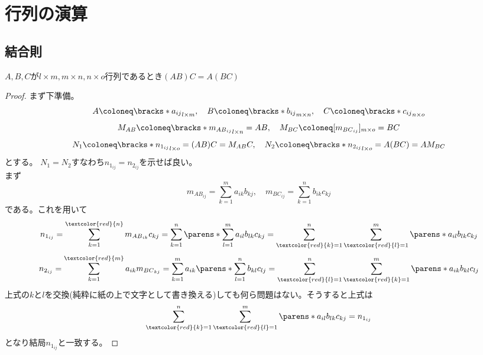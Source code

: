 \chapter{行列の演算}
    \section{結合則}
        \begin{shadebox}
            $A,B,C$が$l \times m, m \times n, n \times o$行列であるとき$(AB)C = A(BC)$
        \end{shadebox}
        \begin{proof}
            まず下準備。
            \[A \coloneq \bracks*{a_{ij}}_{l\times m},\quad B \coloneq \bracks*{b_{ij}}_{m\times n},\quad C \coloneq \bracks*{c_{ij}}_{n\times o}\]
            \[M_{AB} \coloneq \bracks*{m_{{AB}_{ij}}}_{l\times n} = AB,\quad M_{BC} \coloneq [m_{{BC}_{ij}}]_{m\times o} = BC\]
            \[N_1 \coloneq \bracks*{n_{1_{ij}}}_{l\times o} = (AB)C = M_{AB}C,\quad N_2 \coloneq \bracks*{n_{2_{ij}}}_{l\times o} = A(BC) = AM_{BC}\]
            とする。
            $N_1 = N_2$すなわち$n_{1_{ij}} = n_{2_{ij}}$を示せば良い。\\
            まず
            \[m_{{AB}_{ij}} = \sum_{k=1}^{m}{a_{ik}b_{kj}},\quad m_{{BC}_{ij}} = \sum_{k=1}^{n}{b_{ik}c_{kj}}\]
            である。これを用いて
            \[n_{1_{ij}} = \sum_{k=1}^{\textcolor{red}{n}}{m_{{AB}_{ik}}c_{kj}} = \sum_{k=1}^{n}{\parens*{\sum_{l=1}^{m}{a_{il}b_{lk}}}c_{kj}} = \sum_{\textcolor{red}{k}=1}^{n}{\sum_{\textcolor{red}{l}=1}^{m}{\parens*{a_{il}b_{lk}c_{kj}}}}\]
            \[n_{2_{ij}} = \sum_{k=1}^{\textcolor{red}{m}}{a_{ik}m_{{BC}_{kj}}} = \sum_{k=1}^{m}{a_{ik}\parens*{\sum_{l=1}^{n}{b_{kl}c_{lj}}}} = \sum_{\textcolor{red}{l}=1}^{n}{\sum_{\textcolor{red}{k}=1}^{m}{\parens*{a_{ik}b_{kl}c_{lj}}}}\]
            上式の$k$と$l$を交換(純粋に紙の上で文字として書き換える)しても何ら問題はない。そうすると上式は
            \[\sum_{\textcolor{red}{k}=1}^{n}{\sum_{\textcolor{red}{l}=1}^{m}{\parens*{a_{il}b_{lk}c_{kj}}}} = n_{1_{ij}}\]
            となり結局$n_{1_{ij}}$と一致する。
        \end{proof}
